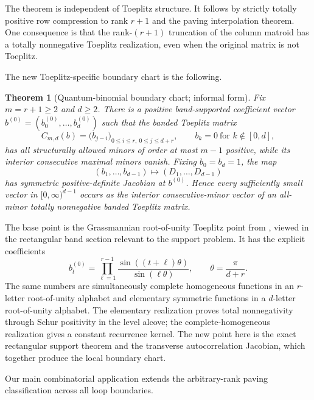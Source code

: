 \documentclass[11pt]{amsart}
\newtheorem{theorem}{Theorem}[section]
\theoremstyle{definition}
\theoremstyle{remark}
\begin{document}
The theorem is independent of Toeplitz structure.  It follows by strictly totally positive row compression to rank $r+1$ and the paving interpolation theorem.  One consequence is that the rank-$(r+1)$ truncation of the column matroid has a totally nonnegative Toeplitz realization, even when the original matrix is not Toeplitz.

The new Toeplitz-specific boundary chart is the following.

\begin{theorem}[Quantum-binomial boundary chart; informal form]\label{thm:intro-qchart}
Fix $m=r+1\ge2$ and $d\ge2$.  There is a positive band-supported coefficient vector $b^{(0)}=(b_0^{(0)},\ldots,b_d^{(0)})$ such that the banded Toeplitz matrix
\[
 C_{m,d}(b)=\bigl(b_{j-i}\bigr)_{0\le i\le r,\ 0\le j\le d+r},
 \qquad b_k=0\ \text{for }k\notin[0,d],
\]
has all structurally allowed minors of order at most $m-1$ positive, while its interior consecutive maximal minors vanish.  Fixing $b_0=b_d=1$, the map
\[
 (b_1,\ldots,b_{d-1})\longmapsto(D_1,\ldots,D_{d-1})
\]
has symmetric positive-definite Jacobian at $b^{(0)}$.  Hence every sufficiently small vector in $[0,\infty)^{d-1}$ occurs as the interior consecutive-minor vector of an all-minor totally nonnegative banded Toeplitz matrix.
\end{theorem}

The base point is the Grassmannian root-of-unity Toeplitz point from \cite{RietschGrassmannian,Rietsch}, viewed in the rectangular band section relevant to the support problem.  It has the explicit coefficients
\[
 b_t^{(0)}=\prod_{\ell=1}^{r-1}
 \frac{\sin((t+\ell)\theta)}{\sin(\ell\theta)},
 \qquad \theta=\frac{\pi}{d+r}.
\]
The same numbers are simultaneously complete homogeneous functions in an $r$-letter root-of-unity alphabet and elementary symmetric functions in a $d$-letter root-of-unity alphabet.  The elementary realization proves total nonnegativity through Schur positivity in the level alcove; the complete-homogeneous realization gives a constant recurrence kernel.  The new point here is the exact rectangular support theorem and the transverse autocorrelation Jacobian, which together produce the local boundary chart.

Our main combinatorial application extends the arbitrary-rank paving classification across all loop boundaries.
\end{document}
